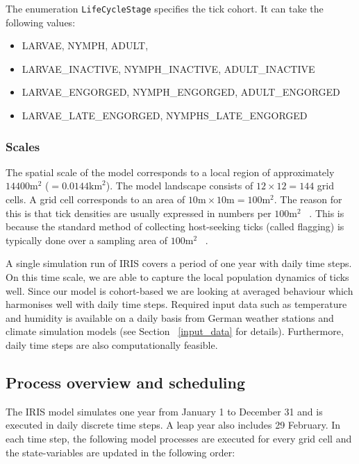 \documentclass[a4paper, 11pt]{scrartcl}
\newcommand{\inlinecode}[1]{\texttt{\small #1}}
\begin{document}
The enumeration \inlinecode{LifeCycleStage} specifies the tick cohort. It can take the following values:
\begin{small}
\begin{itemize}
	\item LARVAE, NYMPH, ADULT,  
	\item LARVAE\_INACTIVE, NYMPH\_INACTIVE, ADULT\_INACTIVE
	\item LARVAE\_ENGORGED, NYMPH\_ENGORGED, ADULT\_ENGORGED
	\item LARVAE\_LATE\_ENGORGED, NYMPHS\_LATE\_ENGORGED
\end{itemize}
\end{small}


\subsubsection{Scales}
The spatial scale of the model corresponds to a local region of approximately $14400 \mathrm{m}^{2}$ ($= 0.0144 \mathrm{km}^{2}$). The model landscape consists of $12 \times 12 = 144$ grid cells. A grid cell corresponds to an area of $10 \mathrm{m} \times 10 \mathrm{m} = 100 \mathrm{m}^{2}$. The reason for this is that tick densities are usually expressed in numbers per $100 \mathrm{m}^{2}$ ~\parencite[see e.g.][Table 2]{Boehnke.2015}. This is because the standard method of collecting host-seeking ticks (called flagging) is typically done over a sampling area of $100 \mathrm{m}^{2}$ ~\parencite{Brugger.2016, Schulz.2014}.

A single simulation run of IRIS covers a period of one year with daily time steps. On this time scale, we are able to capture the local population dynamics of ticks well. Since our model is cohort-based we are looking at averaged behaviour which harmonises well with daily time steps. Required input data such as temperature and humidity is available on a daily basis from German weather stations and climate simulation models (see Section ~\ref{input_data} for details). Furthermore, daily time steps are also computationally feasible.


\subsection{Process overview and scheduling}
The IRIS model simulates one year from January 1 to December 31 and is executed in daily discrete time steps. A leap year also includes 29 February. In each time step, the following model processes are executed for every grid cell and the state-variables are updated in the following order:
\end{document}
